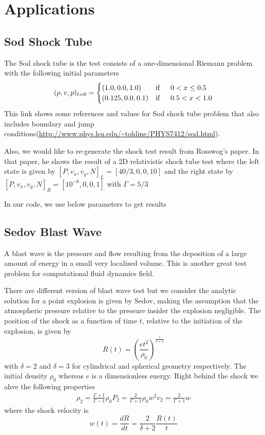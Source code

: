 \documentclass{article}
\begin{document}
\section{Applications}

\subsection{Sod Shock Tube}
The Sod shock tube is the test consists of a one-dimensional Riemann problem with the following initial parameters
\begin{equation}
(\rho, v, p)_{t=0} = \begin{cases}
(1.0,0.0,1.0) & \text{if} \indent 0 < x \leq 0.5 \\
(0.125,0.0,0.1) & \text{if} \indent 0.5 < x < 1.0
\end{cases}
\end{equation}
This link shows some references and values for Sod shock tube problem that also includes boundary and jump conditions(\url{http://www.phys.lsu.edu/~tohline/PHYS7412/sod.html}).

Also, we would like to re-generate the shock test result from Rosswog's paper. In that paper, he shows the result of a 2D relativistic shock tube test where the left state is given by $[P, v_x, v_y, N]_L = [40/3,0,0,10]$ and the right state by $[P, v_x, v_y, N]_R = [10^{-6},0,0,1]$ with $\Gamma = 5/3$

In our code, we use below parameters to get results

\subsection{Sedov Blast Wave}
A blast wave is the pressure and flow resulting from the deposition of a large amount of energy in a small very localized volume. This is another great test problem for computational fluid dynamics field.

There are different version of blast wave test but we consider the analytic solution for a point explosion is given by Sedov, making the assumption that the atmospheric pressure relative to the pressure insider the explosion negligible. The position of the shock as a function of time $t$, relative to the initiation of the explosion, is given by
\begin{equation}
R(t) = \left( \frac{e t^2}{\rho_0} \right)^{\frac{1}{\delta+2}}
\end{equation}
with $\delta = 2$ and $\delta = 3$ for cylindrical and spherical geometry respectively. The initial density $\rho_0$ whereas $e$ is a dimensionless energy. Right behind the shock we ahve the following properties
\begin{align}
\rho_2 = \frac{\Gamma +1}{\Gamma-1} \rho_0
P_2 = \frac{2}{\Gamma+1} \rho_0 w^2
v_2 = \frac{2}{\Gamma+1} w
\end{align}
where the shock velocity is
\begin{equation}
w(t) = \frac{d R}{dt} = \frac{2}{\delta+2} \frac{R(t)}{t}
\end{equation}
\end{document}
